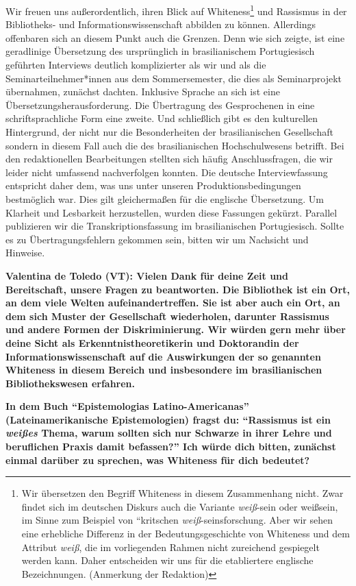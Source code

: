 \documentclass[a4paper,
fontsize=11pt,
oneside,
numbers=noperiodatend,
parskip=half-,
bibliography=totoc,
final
]{scrartcl}
\begin{document}
Wir freuen uns außerordentlich, ihren Blick auf Whiteness\footnote{Wir
  übersetzen den Begriff Whiteness in diesem Zusammenhang nicht. Zwar
  findet sich im deutschen Diskurs auch die Variante \emph{weiß}-sein
  oder weißsein, im Sinne zum Beispiel von ``kritschen
  \emph{weiß}-seinsforschung. Aber wir sehen eine erhebliche Differenz
  in der Bedeutungsgeschichte von Whiteness und dem Attribut
  \emph{weiß}, die im vorliegenden Rahmen nicht zureichend gespiegelt
  werden kann. Daher entscheiden wir uns für die etabliertere englische
  Bezeichnungen. (Anmerkung der Redaktion)} und Rassismus in der
Bibliotheks- und Informationswissenschaft abbilden zu können. Allerdings
offenbaren sich an diesem Punkt auch die Grenzen. Denn wie sich zeigte,
ist eine geradlinige Übersetzung des ursprünglich in brasilianischem
Portugiesisch geführten Interviews deutlich komplizierter als wir und
als die Seminarteilnehmer*innen aus dem Sommersemester, die dies als
Seminarprojekt übernahmen, zunächst dachten. Inklusive Sprache an sich
ist eine Übersetzungsherausforderung. Die Übertragung des Gesprochenen
in eine schriftsprachliche Form eine zweite. Und schließlich gibt es den
kulturellen Hintergrund, der nicht nur die Besonderheiten der
brasilianischen Gesellschaft sondern in diesem Fall auch die des
brasilianischen Hochschulwesens betrifft. Bei den redaktionellen
Bearbeitungen stellten sich häufig Anschlussfragen, die wir leider nicht
umfassend nachverfolgen konnten. Die deutsche Interviewfassung
entspricht daher dem, was uns unter unseren Produktionsbedingungen
bestmöglich war. Dies gilt gleichermaßen für die englische Übersetzung.
Um Klarheit und Lesbarkeit herzustellen, wurden diese Fassungen gekürzt.
Parallel publizieren wir die Transkriptionsfassung im brasilianischen
Portugiesisch. Sollte es zu Übertragungsfehlern gekommen sein, bitten
wir um Nachsicht und Hinweise.

\textbf{Valentina de Toledo (VT): Vielen Dank für deine Zeit und
Bereitschaft, unsere Fragen zu beantworten. Die Bibliothek ist ein Ort,
an dem viele Welten aufeinandertreffen. Sie ist aber auch ein Ort, an
dem sich Muster der Gesellschaft wiederholen, darunter Rassismus und
andere Formen der Diskriminierung. Wir würden gern mehr über deine Sicht
als Erkenntnistheoretikerin und Doktorandin der Informationswissenschaft
auf die Auswirkungen der so genannten Whiteness in diesem Bereich und
insbesondere im brasilianischen Bibliothekswesen erfahren.}

\textbf{In dem Buch \enquote{Epistemologias Latino-Americanas}
(Lateinamerikanische Epistemologien) fragst du: \enquote{Rassismus ist
ein \emph{weißes} Thema, warum sollten sich nur Schwarze in ihrer Lehre
und beruflichen Praxis damit befassen?} Ich würde dich bitten, zunächst
einmal darüber zu sprechen, was Whiteness für dich bedeutet?}
\end{document}
